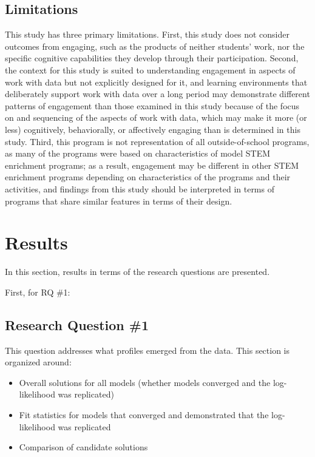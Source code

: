 \documentclass[]{msu-thesis}
\providecommand{\tightlist}{%
  \setlength{\itemsep}{0pt}\setlength{\parskip}{0pt}}
\theoremstyle{definition}
\theoremstyle{definition}
\theoremstyle{definition}
\theoremstyle{remark}
\begin{document}
\section{Limitations}\label{limitations}

This study has three primary limitations. First, this study does not
consider outcomes from engaging, such as the products of neither
students' work, nor the specific cognitive capabilities they develop
through their participation. Second, the context for this study is
suited to understanding engagement in aspects of work with data but not
explicitly designed for it, and learning environments that deliberately
support work with data over a long period may demonstrate different
patterns of engagement than those examined in this study because of the
focus on and sequencing of the aspects of work with data, which may make
it more (or less) cognitively, behaviorally, or affectively engaging
than is determined in this study. Third, this program is not
representation of all outside-of-school programs, as many of the
programs were based on characteristics of model STEM enrichment
programs; as a result, engagement may be different in other STEM
enrichment programs depending on characteristics of the programs and
their activities, and findings from this study should be interpreted in
terms of programs that share similar features in terms of their design.

\chapter{Results}\label{results}

In this section, results in terms of the research questions are
presented.

First, for RQ \#1:

\section{Research Question \#1}\label{research-question-1}

This question addresses what profiles emerged from the data. This
section is organized around:

\begin{itemize}
\tightlist
\item
  Overall solutions for all models (whether models converged and the
  log-likelihood was replicated)
\item
  Fit statistics for models that converged and demonstrated that the
  log-likelihood was replicated
\item
  Comparison of candidate solutions
\end{itemize}
\end{document}
